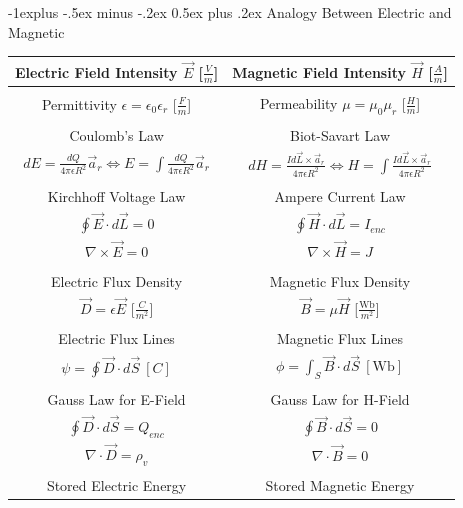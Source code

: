 \documentclass[10pt,landscape]{article}
\makeatletter
\renewcommand{\subsection}{\@startsection{subsection}{2}{0mm}%
                                {-1explus -.5ex minus -.2ex}%
                                {0.5ex plus .2ex}%
                                {\normalfont\normalsize\bfseries}}
\makeatother
\begin{document}
\begin{multicols*}{3}
\subsection{Analogy Between Electric and Magnetic}
   \begin{center}
    \begin{tabular}{c|c}
        \textbf{Electric Field Intensity} $\vec{E}$ [$\frac{V}{m}$] & \textbf{Magnetic Field Intensity} $\vec{H}$ [$\frac{A}{m}$] \\
        \hline \\
        Permittivity $\epsilon = \epsilon_0 \epsilon_r$ [$\frac{F}{m}$] & Permeability $\mu = \mu_0 \mu_r$ [$\frac{H}{m}$] \\ \\
        Coulomb's Law & Biot-Savart Law  \\ $dE = \frac{dQ}{4\pi \epsilon R^2} \vec{a}_r \Longleftrightarrow E = \int \frac{dQ}{4\pi \epsilon R^2} \vec{a}_r$ & $dH = \frac{Id\vec{L} \times \vec{a}_r}{4\pi \epsilon R^2} \Longleftrightarrow H = \int \frac{Id\vec{L} \times \vec{a}_r}{4\pi \epsilon R^2}$ \\ \\
        Kirchhoff Voltage Law & Ampere Current Law\\
        $\oint \vec{E} \cdot d\vec{L} = 0$ & $ \oint \vec{H} \cdot d\vec{L} = I_{enc} $  \\ 
        $\nabla \times \vec{E} = 0$ & $\nabla \times \vec{H} = J$ \\ \\
        Electric Flux Density & Magnetic Flux Density \\
        $\vec{D} = \epsilon \vec{E} $ [$\frac{C}{m^2}$] &  $\vec{B} = \mu \vec{H} $ [$\frac{\text{Wb}}{m^2}$] \\ \\
        Electric Flux Lines & Magnetic Flux Lines \\
        $\psi =  \oint \vec{D} \cdot d\vec{S} \ [C]$ & $\phi =  \int_S \vec{B} \cdot d\vec{S} \ [\text{Wb}]$ \\ \\
        Gauss Law for E-Field & Gauss Law for H-Field \\ 
        $\oint \vec{D} \cdot d\vec{S} = Q_{enc}$ & $\oint \vec{B} \cdot d\vec{S} = 0$ \\
        $\nabla \cdot \vec{D} = \rho_v$ & $\nabla \cdot \vec{B} = 0$ \\ \\
        Stored Electric Energy & Stored Magnetic Energy \\

\end{tabular}
\end{center}
\end{multicols*}
\end{document}
